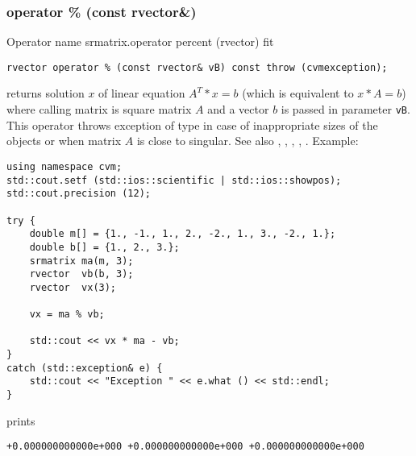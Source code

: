 \subsubsection{operator \% (const rvector\&)}
Operator%
\pdfdest name {srmatrix.operator percent (rvector)} fit
\begin{verbatim}
rvector operator % (const rvector& vB) const throw (cvmexception);
\end{verbatim}
returns solution $x$ of  linear equation
$A^T*x=b$ (which is equivalent to $x*A=b$) 
where calling matrix is square matrix $A$
and a vector $b$ is passed in parameter \verb"vB".
This operator throws exception 
of type 
in case of inappropriate sizes
of the objects or when  matrix $A$ is close to singular.
See also , 
, 
, 
, .
Example:
\begin{Verbatim}
using namespace cvm;
std::cout.setf (std::ios::scientific | std::ios::showpos);
std::cout.precision (12);

try {
    double m[] = {1., -1., 1., 2., -2., 1., 3., -2., 1.};
    double b[] = {1., 2., 3.};
    srmatrix ma(m, 3);
    rvector  vb(b, 3);
    rvector  vx(3);

    vx = ma % vb;

    std::cout << vx * ma - vb;
}
catch (std::exception& e) {
    std::cout << "Exception " << e.what () << std::endl;
}
\end{Verbatim}
prints
\begin{Verbatim}
+0.000000000000e+000 +0.000000000000e+000 +0.000000000000e+000
\end{Verbatim}
\newpage





